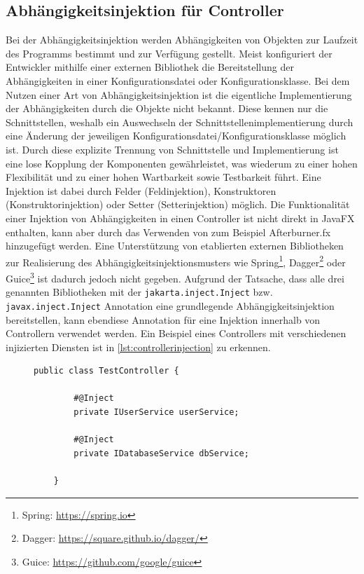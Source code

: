 \subsection{Abhängigkeitsinjektion für Controller}
Bei der Abhängigkeitsinjektion werden Abhängigkeiten von Objekten zur Laufzeit des Programms bestimmt und zur Verfügung gestellt. Meist konfiguriert der Entwickler mithilfe einer externen Bibliothek die Bereitstellung der Abhängigkeiten in einer Konfigurationsdatei oder Konfigurationsklasse. Bei dem Nutzen einer Art von Abhängigkeitsinjektion ist die eigentliche Implementierung der Abhängigkeiten durch die Objekte nicht bekannt. Diese kennen nur die Schnittstellen, weshalb ein Auswechseln der Schnittstellenimplementierung durch eine Änderung der jeweiligen Konfigurationsdatei/Konfigurationsklasse möglich ist. Durch diese explizite Trennung von Schnittstelle und Implementierung ist eine lose Kopplung der Komponenten gewährleistet, was wiederum zu einer hohen Flexibilität und zu einer hohen Wartbarkeit sowie Testbarkeit führt. Eine Injektion ist dabei durch Felder (Feldinjektion), Konstruktoren (Konstruktorinjektion) oder Setter (Setterinjektion) möglich. Die Funktionalität einer Injektion von Abhängigkeiten in einen Controller ist nicht direkt in JavaFX enthalten, kann aber durch das Verwenden von zum Beispiel Afterburner.fx hinzugefügt werden. Eine Unterstützung von etablierten externen Bibliotheken zur Realisierung des Abhängigkeitsinjektionsmusters wie Spring\footnote{Spring: \url{https://spring.io}}, Dagger\footnote{Dagger: \url{https://square.github.io/dagger/}} oder Guice\footnote{\label{ft:guice}Guice: \url{https://github.com/google/guice}} ist dadurch jedoch nicht gegeben. Aufgrund der Tatsache, dass alle drei genannten Bibliotheken mit der \texttt{jakarta.inject.Inject} bzw. \texttt{javax.inject.Inject} Annotation eine grundlegende Abhängigkeitsinjektion bereitstellen, kann ebendiese Annotation für eine Injektion innerhalb von Controllern verwendet werden. Ein Beispiel eines Controllers mit verschiedenen injizierten Diensten ist in \autoref{lst:controllerinjection} zu erkennen.
\begin{figure}[H]
	\centering
	\begin{lstlisting}[caption=Beispiel -- Controller mit injizierten Diensten, captionpos=b, label=lst:controllerinjection]
	public class TestController {
	
		#@Inject
		private IUserService userService;
		
		#@Inject
		private IDatabaseService dbService;
	
	}
	\end{lstlisting}
\end{figure}
